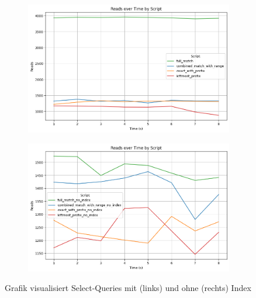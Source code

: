 \vspace{-4pt}
\begin{figure}[H]
    \centering
    \begin{subfigure}[t]{0.48\textwidth}
        \centering
        \includegraphics[width=\textwidth]{PNGs/Script/Index/Hash/hash-query-differences/Reads}
    \end{subfigure}
    \hfill
    \begin{subfigure}[t]{0.48\textwidth}
        \centering
        \includegraphics[width=\textwidth]{PNGs/Script/Index/Hash/hash-query-differences-no-index/Reads}
    \end{subfigure}
    \vspace{-8pt}
    \caption[Hash-Indexing: Unterschiedliche Abfragen mit Index und Ohne]{Grafik visualisiert Select-Queries mit (links) und ohne (rechts) Index}
    \label{fig:indexing-hash-query-reads}
\end{figure}

